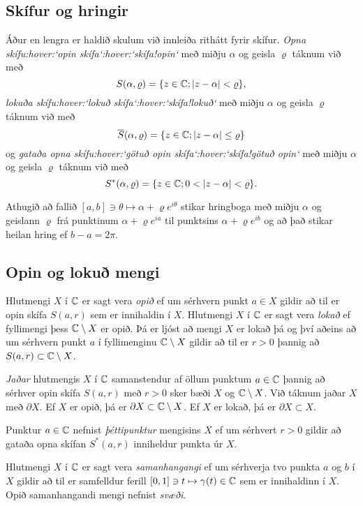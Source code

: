 \subsection*{Skífur og hringir}

Áður en lengra er haldið skulum við innleiða rithátt fyrir skífur.  
{\it Opna skífu:hover:`opin skífa`:hover:`skífa!opin`} með miðju $\alpha$ og geisla
$\varrho$ táknum við með
$$ S(\alpha,\varrho)=\{z\in {\mathbb C}; |z-\alpha|<\varrho\}, $$
{\it lokaða skífu:hover:`lokuð skífa`:hover:`skífa!lokuð`} með miðju $\alpha$ og geisla 
$\varrho$ táknum við með
$$ \overline S(\alpha,\varrho)=\{z\in {\mathbb C}; |z-\alpha|\leq\varrho\} $$
og {\it gataða opna skífu:hover:`götuð opin skífa`:hover:`skífa!götuð opin`} með miðju $\alpha$ og
geisla $\varrho$ táknum við með
$$ S^\ast(\alpha,\varrho)=\{z\in \C; 0<|z-\alpha|<\varrho\}. $$


Athugið að fallið $[a,b]\ni \theta\mapsto \alpha+\varrho e^{i\theta}$ stikar
hringboga með miðju $\alpha$ og geislann $\varrho$ frá punktinum
$\alpha+\varrho e^{ia}$
til punktsins $\alpha+\varrho e^{ib}$ og að það stikar heilan hring ef 
$b-a=2\pi$.

\subsection*{Opin og lokuð mengi}

Hlutmengi $X$ í ${\mathbb C}$ er sagt vera {\it opið} ef um sérhvern punkt $a\in X$
gildir að til er opin skífa $S(a,r)$ sem er innihaldin í $X$.
Hlutmengi  $X$ í ${\mathbb C}$ er sagt vera {\it lokað } ef fyllimengi þess
${\mathbb C}\setminus X$ er opið.  Þá er ljóst að mengi $X$ er lokað þá og því
aðeins að um sérhvern punkt $a$ í fyllimenginu ${\mathbb C}\setminus X$ gildir
að til er $r>0$ þannig að $S(a,r)\subset {\mathbb C}\setminus X$.  


{\it Jaðar} hlutmengis $X$ í ${\mathbb C}$ samanstendur af öllum punktum
$a\in {\mathbb C}$ þannig að sérhver opin skífa $S(a,r)$ með $r>0$ sker bæði
$X$ og ${\mathbb C}\setminus X$.  Við táknum jaðar $X$ með $\partial X$.  
Ef $X$ er opið, þá er $\partial X\subset {\mathbb C}\setminus X$.
Ef $X$ er lokað, þá er $\partial X\subset X$.   

Punktur $a\in {\mathbb C}$ nefnist {\it þéttipunktur} mengisins $X$ ef um
sérhvert $r>0$ gildir að gataða opna skífan $S^\ast(a,r)$ inniheldur
punkta úr $X$.  


Hlutmengi $X$ í ${\mathbb C}$ er sagt vera
{\it samanhangangi} ef um sérhverja tvo punkta $a$ og $b$ í 
$X$ gildir að til er samfelldur ferill  $[0,1]\ni t\mapsto \gamma(t)\in {\mathbb C}$ sem er
innihaldinn í $X$.   Opið samanhangandi mengi nefnist {\it svæði}.  


